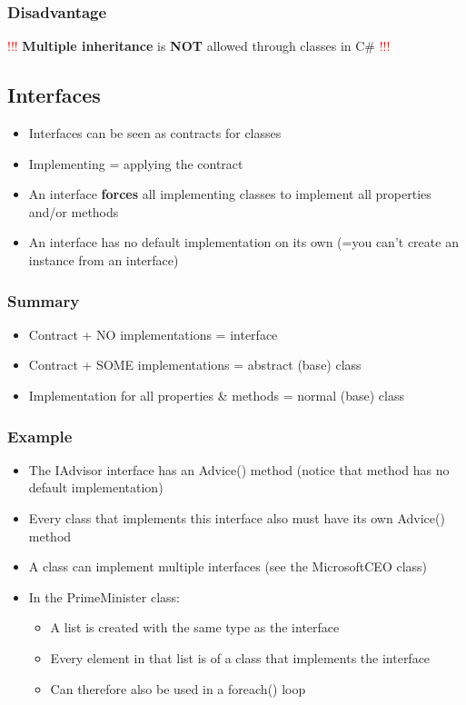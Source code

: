 \documentclass{article}
\newcommand{\bold}[1]{\textbf{#1}}
\begin{document}
\subsubsection{Disadvantage}

\textcolor{red}{!!!} \bold{Multiple inheritance} is \bold{NOT} allowed through classes in C\# \textcolor{red}{!!!}

\subsection{Interfaces}

\begin{itemize}
    \item Interfaces can be seen as contracts for classes
    \item Implementing = applying the contract
    \item An interface \bold{forces} all implementing classes to implement all properties and/or methods
    \item An interface has no default implementation on its own (=you can't create an instance from an interface)
\end{itemize}

\subsubsection{Summary}

\begin{itemize}
    \item Contract + NO implementations = interface
    \item Contract + SOME implementations = abstract (base) class
    \item Implementation for all properties \& methods = normal (base) class
\end{itemize}

\subsubsection{Example}

\begin{itemize}
    \item The IAdvisor interface has an Advice() method (notice that method has no default implementation)
    \item Every class that implements this interface also must have its own Advice() method
    \item A class can implement multiple interfaces (see the MicrosoftCEO class)
    \item In the PrimeMinister class:
    \begin{itemize}
        \item A list is created with the same type as the interface
        \item Every element in that list is of a class that implements the interface
        \item Can therefore also be used in a foreach() loop
    \end{itemize}
\end{itemize}
\end{document}

